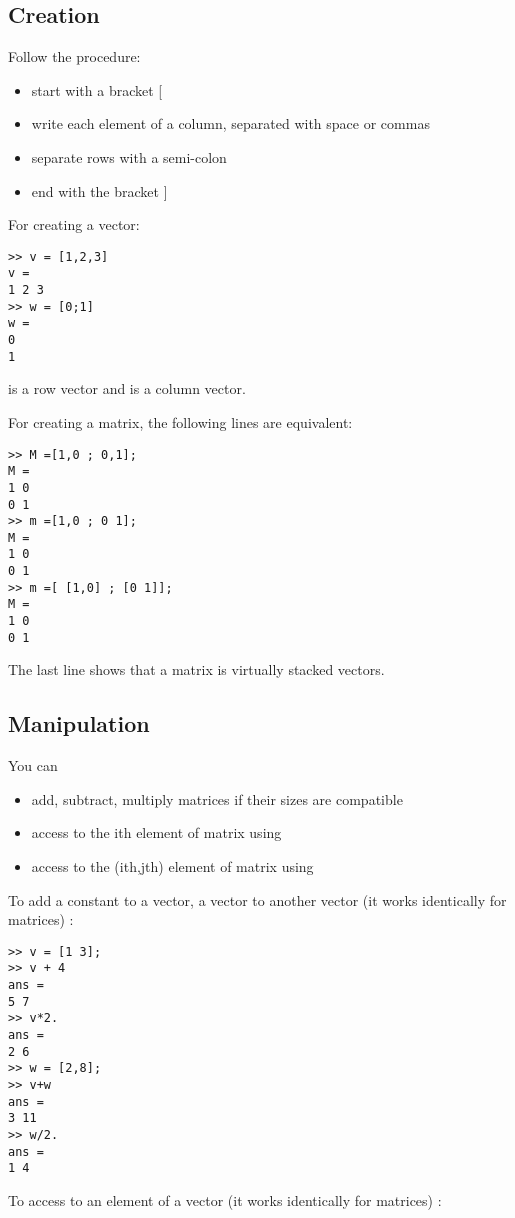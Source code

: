 \subsection{Creation}
Follow the procedure:
\begin{itemize}
	\item start with a bracket [
	\item write each element of a column, separated with space or commas
	\item separate rows with a semi-colon
	\item end with the bracket ]
\end{itemize}


For creating a vector:

\begin{lstlisting}
>> v = [1,2,3]
v =
1 2 3
>> w = [0;1]
w =
0
1
\end{lstlisting}
 is a row vector and  is a column vector.

For creating a matrix, the following lines are equivalent:
\begin{lstlisting}
>> M =[1,0 ; 0,1];
M = 
1 0
0 1
>> m =[1,0 ; 0 1];
M = 
1 0
0 1
>> m =[ [1,0] ; [0 1]];
M = 
1 0
0 1
\end{lstlisting}

The last line shows that a matrix is virtually stacked vectors.

\subsection{Manipulation}
You can
\begin{itemize}
	\item add, subtract, multiply matrices if their sizes are compatible
	\item access to the ith element of matrix  using 
	\item access to the (ith,jth) element of matrix  using 
\end{itemize}	



To add a constant to a vector, a vector to another vector (it works identically for matrices) :
\begin{lstlisting}
>> v = [1 3];
>> v + 4
ans =
5 7
>> v*2.
ans =
2 6
>> w = [2,8];
>> v+w
ans =
3 11
>> w/2.
ans =
1 4
\end{lstlisting}

To access to an element of a vector  (it works identically for matrices) :

